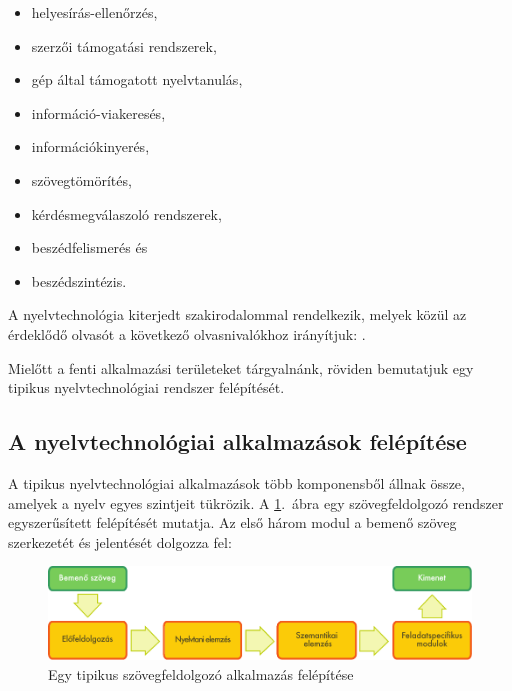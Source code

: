 \begin{multicols}{2}
  \begin{itemize}
        \item helyesírás-ellenőrzés,
        \item szerzői támogatási rendszerek,
        \item gép által támogatott nyelvtanulás,
        \item információ-viakeresés, 
        \item információkinyerés,
        \item szövegtömörítés,
        \item kérdésmegválaszoló rendszerek,
        \item beszédfelismerés és
        \item beszédszintézis.
      \end{itemize}

  A nyelvtechnológia kiterjedt szakirodalommal rendelkezik, melyek közül az érdeklődő olvasót a következő olvasnivalókhoz irányítjuk: \cite{jurafsky-martin01} \cite{manning-schuetze1} \cite{lt-world1} \cite{lt-survey1}.

  Mielőtt a fenti alkalmazási területeket tárgyalnánk, röviden bemutatjuk egy tipikus nyelvtechnológiai rendszer felépítését. 

  \subsection{A nyelvtechnológiai alkalmazások felépítése}

  A tipikus nyelvtechnológiai alkalmazások több komponensből állnak össze, amelyek a nyelv egyes szintjeit tükrözik. A \ref{fig:textprocessingarch_de}.~ábra egy szövegfeldolgozó rendszer egyszerűsített felépítését mutatja. Az első három modul a bemenő szöveg szerkezetét és jelentését dolgozza fel:

  \begin{figure}[htb]
    \center
    \includegraphics[width=\textwidth]{../_media/hungarian/text_processing_app_architecture}
    \caption{Egy tipikus szövegfeldolgozó alkalmazás felépítése}
    \label{fig:textprocessingarch_de}
  \end{figure}


\end{multicols}
